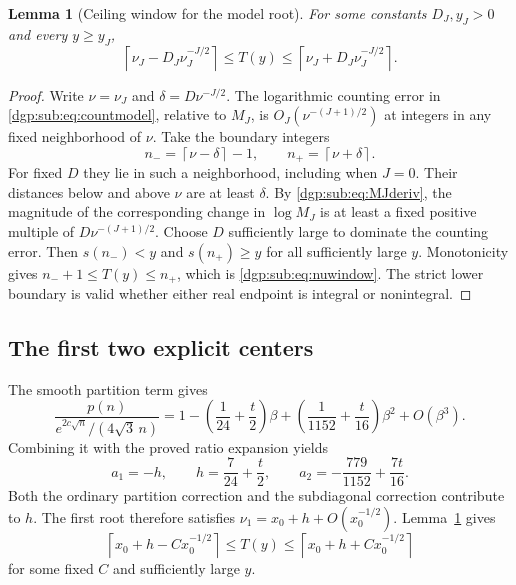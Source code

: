 \documentclass[11pt,letterpaper]{article}
\numberwithin{equation}{section}
\newtheorem{lemma}[theorem]{Lemma}
\theoremstyle{remark}\newtheorem{remark}[theorem]{Remark}
\newcommand{\ceil}[1]{\left\lceil #1\right\rceil}
\begin{document}
\begin{lemma}[Ceiling window for the model root]\label{dgp:sub:lem:window}
For some constants $D_J,y_J>0$ and every $y\geq y_J$,
\begin{equation}\label{dgp:sub:eq:nuwindow}
 \ceil{\nu_J-D_J\nu_J^{-J/2}}\leq T(y)
 \leq\ceil{\nu_J+D_J\nu_J^{-J/2}}.
\end{equation}
\end{lemma}
\begin{proof}
Write $\nu=\nu_J$ and $\delta=D\nu^{-J/2}$. The logarithmic
counting error in \eqref{dgp:sub:eq:countmodel}, relative to $M_J$, is
$O_J(\nu^{-(J+1)/2})$ at integers in any fixed neighborhood of
$\nu$. Take the boundary integers
\[
 n_- =\ceil{\nu-\delta}-1,\qquad n_+=\ceil{\nu+\delta}.
\]
For fixed $D$ they lie in such a neighborhood, including when
$J=0$. Their distances below and above $\nu$ are at least
$\delta$. By \eqref{dgp:sub:eq:MJderiv}, the magnitude of the corresponding
change in $\log M_J$ is at least a fixed positive multiple of
$D\nu^{-(J+1)/2}$. Choose $D$ sufficiently large to dominate the
counting error. Then $s(n_-)<y$ and $s(n_+)\geq y$ for all
sufficiently large $y$. Monotonicity gives
$n_-+1\leq T(y)\leq n_+$, which is \eqref{dgp:sub:eq:nuwindow}.
The strict lower boundary is valid whether either real endpoint
is integral or nonintegral.
\end{proof}

\subsection{The first two explicit centers}
The smooth partition term gives
\begin{equation}\label{dgp:sub:eq:partrel}
 \frac{p(n)}{e^{2c\sqrt n}/(4\sqrt3\,n)}
 =1-\left(\frac1{24}+\frac t2\right)\beta
    +\left(\frac1{1152}+\frac t{16}\right)\beta^2+O(\beta^3).
\end{equation}
Combining it with the proved ratio expansion yields
\begin{equation}\label{dgp:sub:eq:ha2}
 a_1=-h,\qquad h=\frac7{24}+\frac t2,
 \qquad a_2=-\frac{779}{1152}+\frac{7t}{16}.
\end{equation}
Both the ordinary partition correction and the subdiagonal
correction contribute to $h$.
The first root therefore satisfies
$\nu_1=x_0+h+O(x_0^{-1/2})$. Lemma~\ref{dgp:sub:lem:window} gives
\[
 \ceil{x_0+h-Cx_0^{-1/2}}\leq T(y)
 \leq\ceil{x_0+h+Cx_0^{-1/2}}
\]
for some fixed $C$ and sufficiently large $y$.
\end{document}
